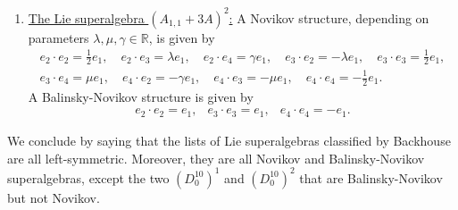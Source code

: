 \documentclass[12pt]{amsart}
\begin{document}
\begin{enumerate}
 \item \underline{The Lie superalgebra 
  $(A_{1,1}+3A)^2$:} A Novikov structure, depending on parameters $\lambda, \mu, \gamma \in \mathbb R$, is given by
    \[
\begin{array}{l}
e_2\cdot e_2=\frac{1}{2}e_1, \quad e_2\cdot e_3= \lambda e_1, \quad e_2\cdot e_4= \gamma e_1, \quad e_3\cdot e_2=-\lambda e_1, \quad e_3\cdot e_3=\frac{1}{2} e_1,\\[2mm]
e_3\cdot e_4= \mu e_1,\quad e_4\cdot e_2=-\gamma e_1, \quad e_4\cdot e_3=-\mu  e_1, \quad e_4\cdot e_4=-\frac{1}{2}e_1.
\end{array}
 \]
A Balinsky-Novikov structure is given by
 \[
 \begin{array}{llll}
e_2 \cdot e_2=   e_1, & e_3 \cdot e_3
= e_1, & 
e_4 \cdot e_4= -e_1.
 \end{array}
 \]
 \end{enumerate}
 We conclude by saying that the lists of Lie superalgebras classified by Backhouse are all left-symmetric. Moreover, they are all Novikov and Balinsky-Novikov superalgebras, except the two $(D_0^{10})^1$  and $(D_0^{10})^2$ that are Balinsky-Novikov but not Novikov. 
\end{document}
